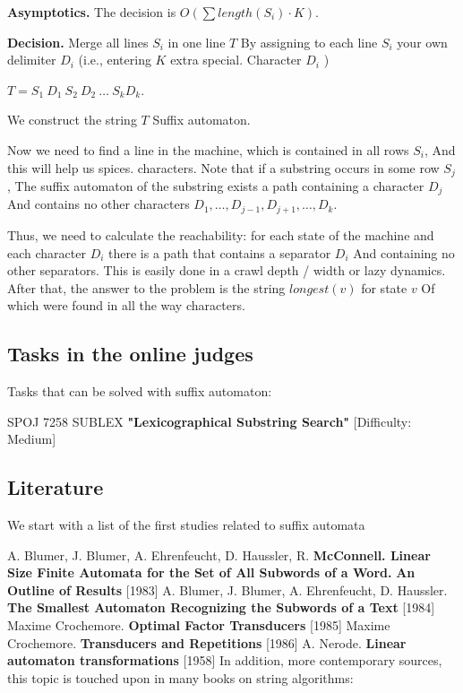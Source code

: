 \textbf{Asymptotics.} The decision is $O (\sum length (S_i) \cdot K)$.

\textbf{Decision.} Merge all lines $S_i$ in one line $T$ By assigning to each line $S_i$ your own delimiter $D_i$ (i.e., entering $K$ extra special. Character $D_i$ )

$T = S_1 ~ D_1 ~ S_2 ~ D_2 ~ \ldots ~ S_k D_k.$

We construct the string $T$ Suffix automaton.

Now we need to find a line in the machine, which is contained in all rows $S_i$, And this will help us spices. characters. Note that if a substring occurs in some row $S_j$, The suffix automaton of the substring exists a path containing a character $D_j$ And contains no other characters $D_1, \ldots, D_ {j-1}, D_ {j +1}, \ldots, D_k$.

Thus, we need to calculate the reachability: for each state of the machine and each character $D_i$ there is a path that contains a separator $D_i$ And containing no other separators. This is easily done in a crawl depth / width or lazy dynamics. After that, the answer to the problem is the string $longest (v)$ for state $v$ Of which were found in all the way characters.

\subsection{ Tasks in the online judges }

Tasks that can be solved with suffix automaton:

SPOJ 7258 SUBLEX \textbf{"Lexicographical Substring Search"} [Difficulty: Medium]

\subsection{ Literature }

We start with a list of the first studies related to suffix automata

A. Blumer, J. Blumer, A. Ehrenfeucht, D. Haussler, R. \textbf{McConnell. Linear Size Finite Automata for the Set of All Subwords of a Word.} \textbf{An Outline of Results} [1983]
A. Blumer, J. Blumer, A. Ehrenfeucht, D. Haussler. \textbf{The Smallest Automaton Recognizing the Subwords of a Text} [1984]
Maxime Crochemore. \textbf{Optimal Factor Transducers} [1985]
Maxime Crochemore. \textbf{Transducers and Repetitions} [1986]
A. Nerode. \textbf{Linear automaton transformations} [1958]
In addition, more contemporary sources, this topic is touched upon in many books on string algorithms:

